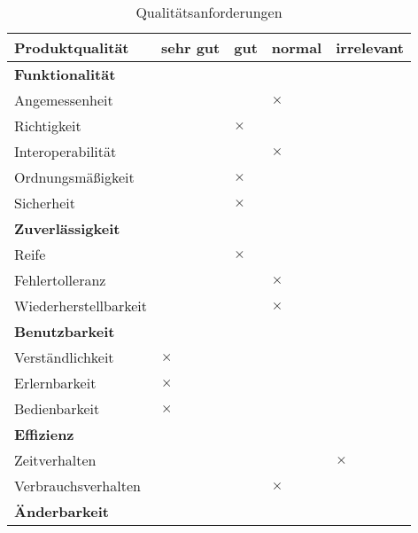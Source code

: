 \begin{table}[H]
	\centering
	\caption{Qualitätsanforderungen}
	\begin{tabular}{|l|p{2cm}|p{2cm}|p{2cm}|p{2cm}|}
		\hline
		\rowcolor{lightgray} \textbf{Produktqualität}       & \centering \textbf{sehr gu}t & \centering \textbf{gut}      & \centering \textbf{normal}   & \textbf{irrelevant} \\ \hline
		\multicolumn{5}{|l|}{\textbf{Funktionalität}}                           \\ \hline
		\quad Angemessenheit        &          &          & $\times$ &  \\ \hline
		\quad Richtigkeit           &          & \centering $\times$ &          &  \\ \hline
		\quad Interoperabilität     &          &          & $\times$ &  \\ \hline
		\quad Ordnungsmäßigkeit     &          & $\times$ &          &  \\ \hline
		\quad Sicherheit            &          & $\times$ &          &  \\ \hline
		\multicolumn{5}{|l|}{\textbf{Zuverlässigkeit}}                          \\ \hline
		\quad Reife                 &          & $\times$ &          &  \\ \hline
		\quad Fehlertolleranz       &          &          & $\times$ &  \\ \hline
		\quad Wiederherstellbarkeit &          &          & $\times$ &  \\ \hline
		\multicolumn{5}{|l|}{\textbf{Benutzbarkeit}}                            \\ \hline
		\quad Verständlichkeit      & $\times$ &          &          &  \\ \hline
		\quad Erlernbarkeit         & $\times$ &          &          &  \\ \hline
		\quad Bedienbarkeit         & $\times$ &          &          &  \\ \hline
		\multicolumn{5}{|l|}{\textbf{Effizienz}}                                \\ \hline
		\quad Zeitverhalten         &          &          &          & $\times$       \\ \hline
		\quad Verbrauchsverhalten   &          &          & $\times$ &  \\ \hline
		\multicolumn{5}{|l|}{\textbf{Änderbarkeit}}                             \\ \hline

\end{tabular}
\end{table}
